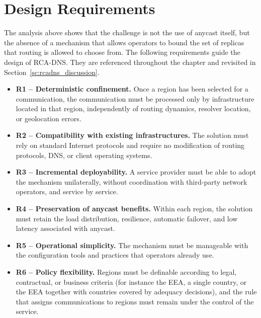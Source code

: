 \section{Design Requirements}
\label{sc:rcadns_requirements}

The analysis above shows that the challenge is not the use of anycast itself, but the absence of a mechanism that allows operators to bound the set of replicas that routing is allowed to choose from. The following requirements guide the design of RCA-DNS. They are referenced throughout the chapter and revisited in Section~\ref{sc:rcadns_discussion}.

\begin{itemize}
    \item \textbf{R1 -- Deterministic confinement.} Once a region has been selected for a communication, the communication must be processed only by infrastructure located in that region, independently of routing dynamics, resolver location, or geolocation errors.

    \item \textbf{R2 -- Compatibility with existing infrastructures.} The solution must rely on standard Internet protocols and require no modification of routing protocols, DNS, or client operating systems.

    \item \textbf{R3 -- Incremental deployability.} A service provider must be able to adopt the mechanism unilaterally, without coordination with third-party network operators, and service by service.

    \item \textbf{R4 -- Preservation of anycast benefits.} Within each region, the solution must retain the load distribution, resilience, automatic failover, and low latency associated with anycast.

    \item \textbf{R5 -- Operational simplicity.} The mechanism must be manageable with the configuration tools and practices that operators already use.

    \item \textbf{R6 -- Policy flexibility.} Regions must be definable according to legal, contractual, or business criteria (for instance the EEA, a single country, or the EEA together with countries covered by adequacy decisions), and the rule that assigns communications to regions must remain under the control of the service.
\end{itemize}

